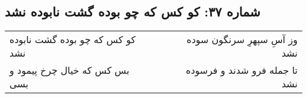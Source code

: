 \begin{center}
\section*{شماره ۳۷: کو کس که چو بوده گشت نابوده نشد}
\label{sec:037}
\begin{longtable}{l p{0.5cm} r}
کو کس که چو بوده گشت نابوده نشد
&&
وز آسِ سپهرِ سرنگون سوده نشد
\\
بس کس که خیال چرخ پیمود و بسی
&&
تا جمله فرو شدند و فرسوده نشد
\\
\end{longtable}
\end{center}
